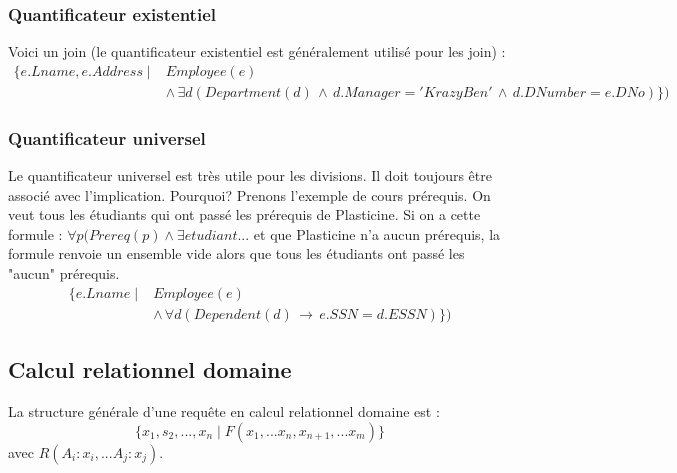 \documentclass[a4paper]{article}
\begin{document}
  \subsubsection{Quantificateur existentiel}
  Voici un join (le quantificateur existentiel est généralement utilisé pour les
  join) :
  \begin{align*}
    \{e.Lname, e.Address\; | \; &Employee(e)\\
    &\land\, \exists d (Department(d) \,\land\, d.Manager = 'KrazyBen'\, \land\, d.DNumber = e.DNo)\} )
  \end{align*}

  \subsubsection{Quantificateur universel}
  Le quantificateur universel est très utile pour les divisions.
  Il doit toujours être associé avec l'implication. Pourquoi? Prenons l'exemple
  de cours prérequis. On veut tous les étudiants qui ont passé les prérequis
  de Plasticine. Si on a cette formule : $\forall p (Prereq(p) \land \exists etudiant ...$ et que Plasticine n'a aucun prérequis, la formule renvoie un ensemble
  vide alors que tous les étudiants ont passé les "aucun" prérequis.
  \begin{align*}
    \{e.Lname\; | \; &Employee(e)\\
    &\land\, \forall d (Dependent(d) \,\rightarrow\, e.SSN = d.ESSN)\} )
  \end{align*}

  \subsection{Calcul relationnel domaine}
  La structure générale d'une requête en calcul relationnel domaine est :
  $$ \{x_1, s_2,...,x_n\; | \; F(x_1, ... x_n,x_{n+1},...x_{m})\} $$
  avec $R(A_i:x_i,...A_j:x_j)$.
\end{document}
